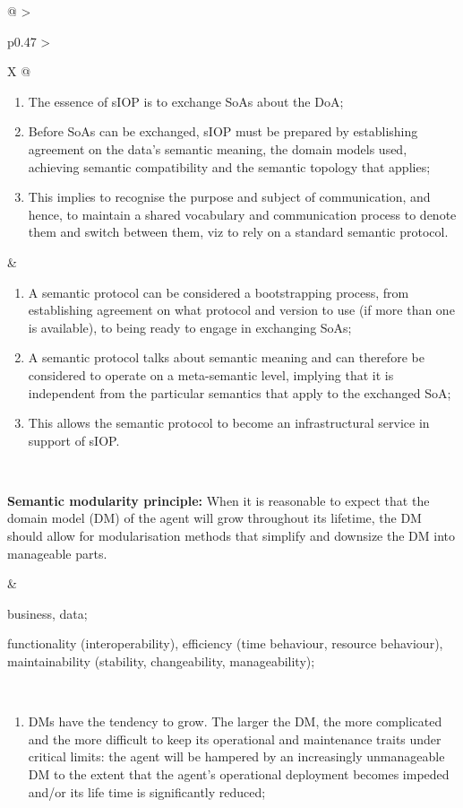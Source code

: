 \begin{xltabular}[l]{\linewidth}{@{} >{\small\raggedright\arraybackslash}p{0.47\linewidth} >{\small\raggedright\arraybackslash}X @{}}
\begin{enumerate}[left=6pt, nosep]
  \item The essence of sIOP is to exchange SoAs about the DoA;
  \item Before SoAs can be exchanged, sIOP must be prepared by establishing agreement on the data's semantic meaning, the domain models used, achieving semantic compatibility and the semantic topology that applies;
  \item This implies to recognise the purpose and subject of communication, and hence, to maintain a shared vocabulary and communication process to denote them and switch between them, viz to rely on a standard semantic protocol.
\end{enumerate}
&
\begin{enumerate}[left=10pt, nosep]
  \item A semantic protocol can be considered a bootstrapping process, from establishing agreement on what protocol and version to use (if more than one is available), to being ready to engage in exchanging SoAs;
  \item A semantic protocol talks about semantic meaning and can therefore be considered to operate on a meta-semantic level, implying that it is independent from the particular semantics that apply to the exchanged SoA;
  \item This allows the semantic protocol to become an infrastructural service in support of sIOP.
\end{enumerate} \\
%
%
%
\begin{mmdp}\label{dp:smp}{\bfseries Semantic modularity principle:}
\quad When it is reasonable to expect that the domain model (DM) of the agent will grow throughout its lifetime, the DM should allow for modularisation methods that simplify and downsize the DM into manageable parts. 
\end{mmdp}
&
\begin{description}[labelwidth=3.7cm,leftmargin=3.7cm+1ex,nosep,topsep=2ex,labelsep=1ex,font=\bfseries]
  \item[Type of information:] business, data;
  \item[Quality attributes:] functionality (interoperability), efficiency (time behaviour, resource behaviour), maintainability (stability, changeability, manageability);
\end{description} \\
\begin{enumerate}[left=6pt, nosep]
  \item DMs have the tendency to grow. The larger the DM, the more complicated and the more difficult to keep its operational and maintenance traits under critical limits: the agent will be hampered by an increasingly unmanageable DM to the extent that the agent's operational deployment becomes impeded and/or its life time is significantly reduced;

\end{enumerate}
\end{xltabular}
